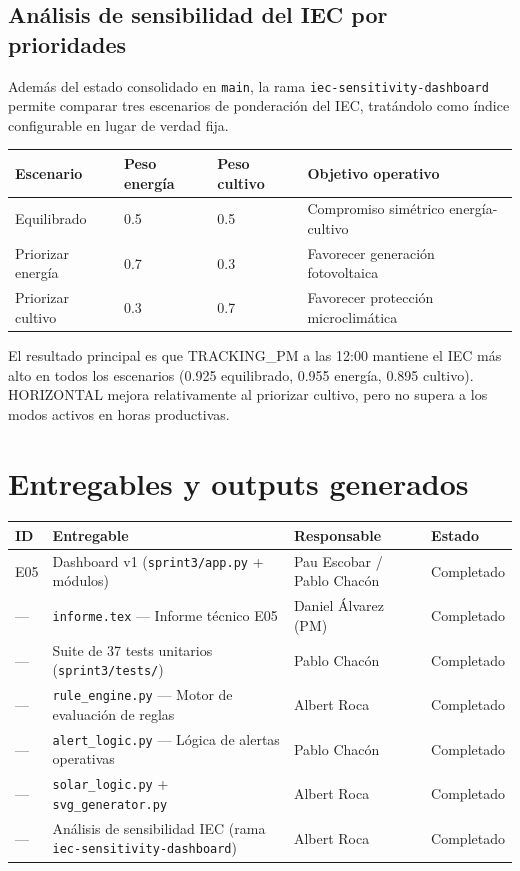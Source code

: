 \documentclass[11pt,a4paper]{article}
\begin{document}
\subsection{Análisis de sensibilidad del IEC por prioridades}

Además del estado consolidado en \texttt{main}, la rama \texttt{iec-sensitivity-dashboard}
permite comparar tres escenarios de ponderación del IEC, tratándolo como índice configurable
en lugar de verdad fija.

\begin{longtable}{p{} p{} p{} p{}}
\textbf{Escenario} & \textbf{Peso energía} & \textbf{Peso cultivo} & \textbf{Objetivo operativo} \\
\hline
Equilibrado         & 0.5 & 0.5 & Compromiso simétrico energía-cultivo \\
Priorizar energía   & 0.7 & 0.3 & Favorecer generación fotovoltaica \\
Priorizar cultivo   & 0.3 & 0.7 & Favorecer protección microclimática \\
\end{longtable}

El resultado principal es que TRACKING\_PM a las 12:00 mantiene el IEC más alto en todos
los escenarios (0.925 equilibrado, 0.955 energía, 0.895 cultivo). HORIZONTAL mejora
relativamente al priorizar cultivo, pero no supera a los modos activos en horas productivas.

\section{Entregables y outputs generados}

\begin{longtable}{p{} p{} p{} p{}}
\textbf{ID} & \textbf{Entregable} & \textbf{Responsable} & \textbf{Estado} \\
\hline
E05 & Dashboard v1 (\texttt{sprint3/app.py} + módulos) & Pau Escobar / Pablo Chacón & Completado \\
— & \texttt{informe.tex} — Informe técnico E05 & Daniel Álvarez (PM) & Completado \\
— & Suite de 37 tests unitarios (\texttt{sprint3/tests/}) & Pablo Chacón & Completado \\
— & \texttt{rule\_engine.py} — Motor de evaluación de reglas & Albert Roca & Completado \\
— & \texttt{alert\_logic.py} — Lógica de alertas operativas & Pablo Chacón & Completado \\
— & \texttt{solar\_logic.py} + \texttt{svg\_generator.py} & Albert Roca & Completado \\
— & Análisis de sensibilidad IEC (rama \texttt{iec-sensitivity-dashboard}) & Albert Roca & Completado \\
\end{longtable}
\end{document}
